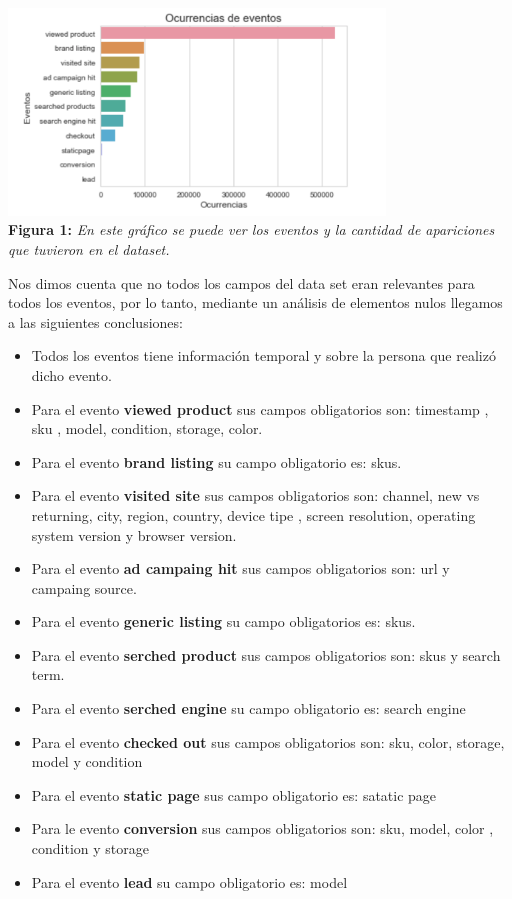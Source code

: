\documentclass[titlepage,a4paper]{article}
\begin{document}
	\begin{center}
	\includegraphics[width=10cm]{ocurrencia_eventos.jpg}\\
	\textbf{Figura 1:}  \textit{En este gráfico se puede ver los eventos y la cantidad de apariciones que tuvieron en el dataset. }
	\end{center}
	
	Nos dimos cuenta que no todos los campos del data set eran relevantes para todos los eventos, por lo tanto, mediante un análisis de elementos nulos llegamos a las siguientes conclusiones: 
	\begin{itemize}
		\item Todos los eventos tiene información temporal y sobre la persona que realizó dicho evento. 
		\item Para el evento \textbf{viewed product} sus campos obligatorios son: timestamp , sku , model, condition, storage, color.
		\item Para el evento \textbf{brand listing} su campo obligatorio es: skus. 
		\item Para el evento \textbf{visited site} sus campos obligatorios son: channel, new vs returning, city, region, country, device tipe , screen resolution, operating system version y browser version.
		\item Para el evento \textbf{ad campaing hit} sus campos obligatorios son: url  y campaing source.
		\item Para el evento \textbf{generic listing} su campo obligatorios es: skus.
		\item Para el evento  \textbf{serched product } sus campos obligatorios son: skus y search term.
		\item Para el evento \textbf{serched engine} su campo obligatorio es: search engine
		\item Para el evento \textbf{checked out}  sus campos obligatorios son: sku, color, storage, model y condition 
		\item Para el evento \textbf{static page}  sus campo obligatorio es: satatic page
		\item Para le evento \textbf{conversion} sus campos obligatorios son:  sku, model, color , condition y storage
		\item Para el evento \textbf{lead} su campo obligatorio es: model
	\end{itemize}	
	
\end{document}
